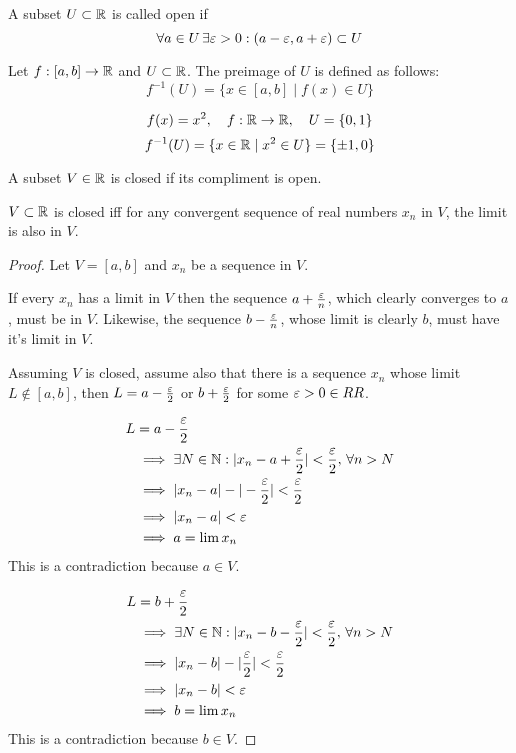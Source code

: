 \documentclass[a4paper,10pt]{article}
\begin{document}
\begin{defn}
	A subset $U \subset \mathbb{R}$ is called open if
	\[
		\forall a \in U \, \exists \varepsilon > 0 :
		(a-\varepsilon, a+\varepsilon) \subset U
	\]
\end{defn}

\begin{defn}[Preimage]
	Let $f:[a,b] \to \mathbb{R}$ and $U \subset \mathbb{R}$. The preimage of $U$
	is defined as follows:
	\[
		f^{-1}(U) = \{ x \in [a,b] \mid f(x) \in U \}
	\]
\end{defn}

\begin{ex}
	\[
		f(x) = x^2, \quad f:\mathbb{R} \to \mathbb{R}, \quad U = \{0,1\}
	\]
	\[
		f^{-1}(U) = \{ x \in \mathbb{R} \mid x^2 \in U \}
		= \{ \pm 1, 0 \}
	\]
\end{ex}

\begin{defn}
	A subset $V \in \mathbb{R}$ is closed if its compliment is open.
\end{defn}

\begin{prop}
	$V \subset \mathbb{R}$ is closed iff for any convergent sequence of
	real numbers $x_n$ in $V$, the limit is also in $V$.
\end{prop}

\begin{proof}
	Let $V = [a,b]$ and $x_n$ be a sequence in $V$.

	If every $x_n$ has a limit in $V$ then the sequence $a +
	\frac{\varepsilon}{n}$, which clearly converges to $a$, must be in $V$.
	Likewise, the sequence $b - \frac{\varepsilon}{n}$, whose limit is
	clearly $b$, must have it's limit in $V$.

	Assuming $V$ is closed, assume also that there is a sequence
	$x_n$ whose limit $L \notin [a,b]$, then $L = a -
	\frac{\varepsilon}{2}$ or $b + \frac{\varepsilon}{2}$ for some $\varepsilon > 0 \in
	RR$.

	\begin{align*}
		L &= a - \frac{\varepsilon}{2} \\
		  &\implies \exists N \in \mathbb{N} : |x_n - a + \frac{\varepsilon}{2}|
		< \frac{\varepsilon}{2}, \,\forall n > N \\
		&\implies |x_n - a| - |- \frac{\varepsilon}{2}| < \frac{\varepsilon}{2} \\
		&\implies |x_n - a| < \varepsilon \\
		&\implies a = \lim x_n
	\end{align*}
	This is a contradiction because $a \in V$.

	\begin{align*}
		L &= b + \frac{\varepsilon}{2} \\
		  &\implies \exists N \in \mathbb{N} : |x_n - b - \frac{\varepsilon}{2}|
		< \frac{\varepsilon}{2}, \,\forall n > N \\
		&\implies |x_n - b| - |\frac{\varepsilon}{2}| < \frac{\varepsilon}{2} \\
		&\implies |x_n - b| < \varepsilon \\
		&\implies b = \lim x_n
	\end{align*}
	This is a contradiction because $b \in V$.
\end{proof}
\end{document}
